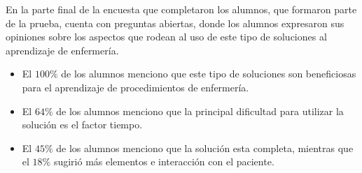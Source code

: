 En la parte final de la encuesta que completaron los alumnos, que formaron parte
de la prueba, cuenta con preguntas abiertas, donde los alumnos expresaron sus
opiniones sobre los aspectos que rodean al uso de este tipo de soluciones al
aprendizaje de enfermería.


\begin{itemize}
    \item El $100\%$ de los alumnos menciono que este tipo de soluciones son
        beneficiosas para el aprendizaje de procedimientos de enfermería.
    \item El $64\%$ de los alumnos menciono que la principal dificultad para
        utilizar la solución es el factor tiempo.
    \item El $45\%$ de los alumnos menciono que la solución esta completa,
        mientras que el $18\%$ sugirió más elementos e interacción con el
        paciente.
\end{itemize}







